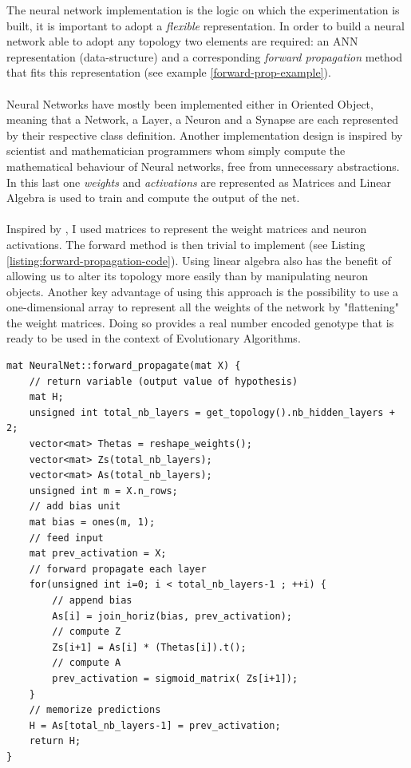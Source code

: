 \documentclass[a4paper,12pt, oneside]{memoir}
\begin{document}
The neural network implementation is the logic on which the experimentation is built, it is important to adopt a \textit{flexible} representation. In order to build a neural network able to adopt any topology two elements are required: an ANN representation (data-structure) and a corresponding \textit{forward propagation} method that fits this representation (see example \ref{forward-prop-example}).
\\
\\
Neural Networks have mostly been implemented either in Oriented Object, meaning that a Network, a Layer, a Neuron and a Synapse are each represented by their respective class definition. Another implementation design is inspired by scientist and mathematician programmers whom simply compute the mathematical behaviour of Neural networks, free from unnecessary abstractions. In this last one \textit{weights} and \textit{activations} are represented as Matrices and Linear Algebra is used to train and compute the output of the net.
\\
\\
Inspired by \cite{coursera-machine-learning-stanford}, I used matrices to represent the weight matrices and neuron activations. The forward method is then trivial to implement (see Listing \ref{listing:forward-propagation-code}). Using linear algebra also has the benefit of allowing us to alter its topology more easily than by manipulating neuron objects. Another key advantage of using this approach is the possibility to use a one-dimensional array to represent all the weights of the network by "flattening" the weight matrices. Doing so provides a real number encoded genotype that is ready to be used in the context of Evolutionary Algorithms.


\vspace{10pt}
\begin{lstlisting}[caption=Vectorized implementation of the forward propagation., label=listing:forward-propagation-code, captionpos=b]
mat NeuralNet::forward_propagate(mat X) {
    // return variable (output value of hypothesis)
    mat H;
    unsigned int total_nb_layers = get_topology().nb_hidden_layers + 2;
    vector<mat> Thetas = reshape_weights();
    vector<mat> Zs(total_nb_layers);
    vector<mat> As(total_nb_layers);
    unsigned int m = X.n_rows;
    // add bias unit
    mat bias = ones(m, 1);
    // feed input
    mat prev_activation = X;
    // forward propagate each layer
    for(unsigned int i=0; i < total_nb_layers-1 ; ++i) {
        // append bias
        As[i] = join_horiz(bias, prev_activation);
        // compute Z
        Zs[i+1] = As[i] * (Thetas[i]).t();
        // compute A
        prev_activation = sigmoid_matrix( Zs[i+1]);
    }
    // memorize predictions
    H = As[total_nb_layers-1] = prev_activation;
    return H;
}
\end{lstlisting}
\end{document}
